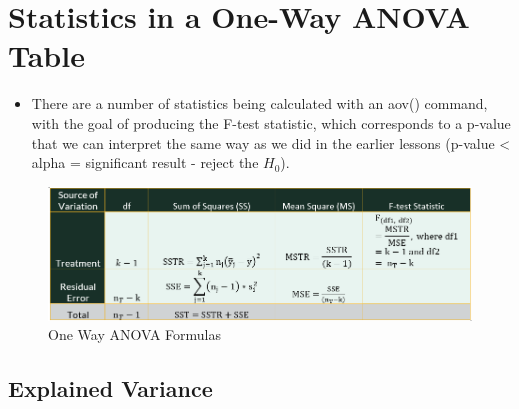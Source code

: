 \documentclass[
  letterpaper,
  DIV=11,
  numbers=noendperiod]{scrreprt}
\providecommand{\tightlist}{%
  \setlength{\itemsep}{0pt}\setlength{\parskip}{0pt}}\usepackage{longtable,booktabs,array}
\begin{document}
\section{Statistics in a One-Way ANOVA
Table}\label{statistics-in-a-one-way-anova-table}

\begin{itemize}
\tightlist
\item
  There are a number of statistics being calculated with an aov()
  command, with the goal of producing the F-test statistic, which
  corresponds to a p-value that we can interpret the same way as we did
  in the earlier lessons (p-value \textless{} alpha = significant result
  - reject the \(H_0\)).
\end{itemize}

\begin{figure}[H]

{\centering \includegraphics{Pictures/Ch7/1WayANOVA.PNG}

}

\caption{One Way ANOVA Formulas}

\end{figure}%

\subsection{Explained Variance}\label{explained-variance}
\end{document}
